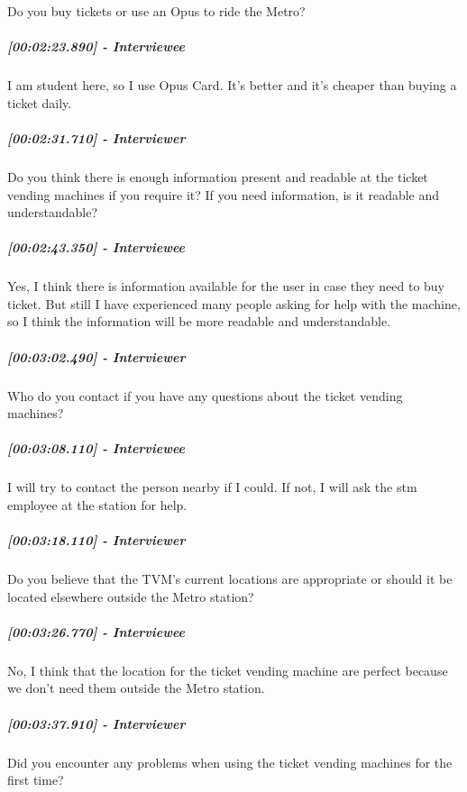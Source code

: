 \documentclass[a4paper,12pt]{article}
\begin{document}
Do you buy tickets or use an Opus to ride the Metro?

\hypertarget{interviewee-10}{%
\subparagraph{{[}00:02:23.890{]} - Interviewee}\label{interviewee-10}}

I am student here, so I use Opus Card. It's better and it's cheaper than
buying a ticket daily.

\hypertarget{interviewer-14}{%
\subparagraph{{[}00:02:31.710{]} - Interviewer}\label{interviewer-14}}

Do you think there is enough information present and readable at the
ticket vending machines if you require it? If you need information, is
it readable and understandable?

\hypertarget{interviewee-11}{%
\subparagraph{{[}00:02:43.350{]} - Interviewee}\label{interviewee-11}}

Yes, I think there is information available for the user in case they
need to buy ticket. But still I have experienced many people asking for
help with the machine, so I think the information will be more readable
and understandable.

\hypertarget{interviewer-15}{%
\subparagraph{{[}00:03:02.490{]} - Interviewer}\label{interviewer-15}}

Who do you contact if you have any questions about the ticket vending
machines?

\hypertarget{interviewee-12}{%
\subparagraph{{[}00:03:08.110{]} - Interviewee}\label{interviewee-12}}

I will try to contact the person nearby if I could. If not, I will ask
the stm employee at the station for help.

\hypertarget{interviewer-16}{%
\subparagraph{{[}00:03:18.110{]} - Interviewer}\label{interviewer-16}}

Do you believe that the TVM's current locations are appropriate or
should it be located elsewhere outside the Metro station?

\hypertarget{interviewee-13}{%
\subparagraph{{[}00:03:26.770{]} - Interviewee}\label{interviewee-13}}

No, I think that the location for the ticket vending machine are perfect
because we don't need them outside the Metro station.

\hypertarget{interviewer-17}{%
\subparagraph{{[}00:03:37.910{]} - Interviewer}\label{interviewer-17}}

Did you encounter any problems when using the ticket vending machines
for the first time?
\end{document}

